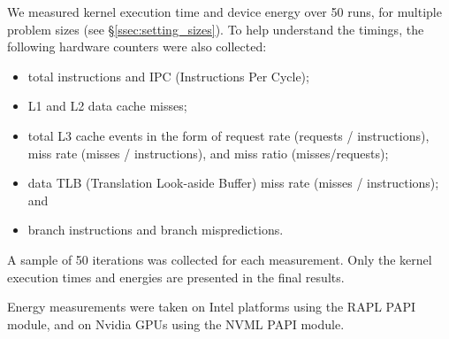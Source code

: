 \documentclass[../document.tex]{subfiles}
\begin{document}
\label{ssec:measurements}


We measured kernel execution time and device energy over 50 runs, for multiple problem sizes (see \S\ref{ssec:setting_sizes}).
To help understand the timings, the following hardware counters were also collected:
\begin{itemize}
	\item total instructions and IPC (Instructions Per Cycle);
	\item L1 and L2 data cache misses;
	\item total L3 cache events in the form of request rate (requests / instructions), miss rate (misses / instructions), and miss ratio (misses/requests);
	\item data TLB (Translation Look-aside Buffer) miss rate (misses / instructions); and
	\item branch instructions and branch mispredictions.
\end{itemize}

A sample of 50 iterations was collected for each measurement.
Only the kernel execution times and energies are presented in the final results.

Energy measurements were taken on Intel platforms using the RAPL PAPI module, and on Nvidia GPUs using the NVML PAPI module.
\end{document}
